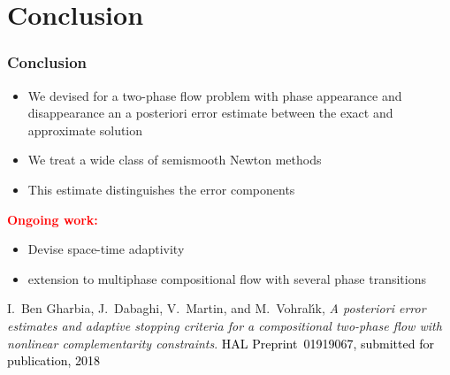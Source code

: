 \documentclass[10 pt]{beamer}
\begin{document}
\section{Conclusion}
\begin{frame}
\frametitle{Conclusion}
\begin{itemize}
\item
We devised for a two-phase flow problem with phase appearance and disappearance an a posteriori error estimate between the exact and approximate solution
\vspace{0.3 cm}
\item We treat a wide class of semismooth Newton methods
\vspace{0.3 cm}
\item 
This estimate distinguishes the error components
\end{itemize}
\vspace{0.5 cm}
\textcolor{red}{\textbf{Ongoing work:}}
\begin{itemize}
\item
 Devise space-time adaptivity 
\item extension to multiphase compositional flow with several phase transitions
\end{itemize}
\vspace{0.5 cm}
\begin{thebibliography}{10}
 \scriptsize{
 {\sc I.~Ben Gharbia, J.~Dabaghi, V.~Martin, and M.~Vohral{\'{\i}}k}, {\em A posteriori error estimates and adaptive stopping criteria for a compositional two-phase flow with nonlinear complementarity constraints}.
 \textcolor{black}{HAL Preprint~01919067, submitted for publication, 2018}}

%


 \end{thebibliography}


\end{frame}
\end{document}
